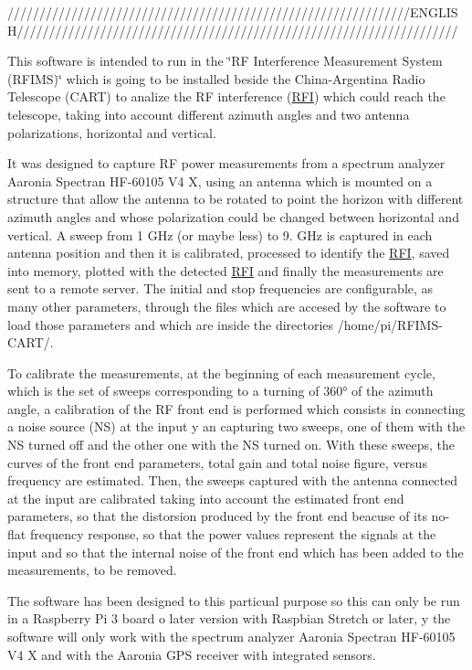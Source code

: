 ///////////////////////////////////////////////////////////////\+E\+N\+G\+L\+I\+S\+H/////////////////////////////////////////////////////////////////////

This software is intended to run in the \char`\"{}\+R\+F Interference Measurement System (\+R\+F\+I\+M\+S)\char`\"{} which is going to be installed beside the China-\/\+Argentina Radio Telescope (C\+A\+RT) to analize the RF interference (\hyperlink{structRFI}{R\+FI}) which could reach the telescope, taking into account different azimuth angles and two antenna polarizations, horizontal and vertical.

It was designed to capture RF power measurements from a spectrum analyzer Aaronia Spectran H\+F-\/60105 V4 X, using an antenna which is mounted on a structure that allow the antenna to be rotated to point the horizon with different azimuth angles and whose polarization could be changed between horizontal and vertical. A sweep from 1 G\+Hz (or maybe less) to 9. G\+Hz is captured in each antenna position and then it is calibrated, processed to identify the \hyperlink{structRFI}{R\+FI}, saved into memory, plotted with the detected \hyperlink{structRFI}{R\+FI} and finally the measurements are sent to a remote server. The initial and stop frequencies are configurable, as many other parameters, through the files which are accesed by the software to load those parameters and which are inside the directories /home/pi/\+R\+F\+I\+M\+S-\/\+C\+A\+R\+T/.

To calibrate the measurements, at the beginning of each measurement cycle, which is the set of sweeps corresponding to a turning of 360° of the azimuth angle, a calibration of the RF front end is performed which consists in connecting a noise source (NS) at the input y an capturing two sweeps, one of them with the NS turned off and the other one with the NS turned on. With these sweeps, the curves of the front end parameters, total gain and total noise figure, versus frequency are estimated. Then, the sweeps captured with the antenna connected at the input are calibrated taking into account the estimated front end parameters, so that the distorsion produced by the front end beacuse of its no-\/flat frequency response, so that the power values represent the signals at the input and so that the internal noise of the front end which has been added to the measurements, to be removed.

The software has been designed to this particual purpose so this can only be run in a Raspberry Pi 3 board o later version with Raspbian Stretch or later, y the software will only work with the spectrum analyzer Aaronia Spectran H\+F-\/60105 V4 X and with the Aaronia G\+PS receiver with integrated sensors.

